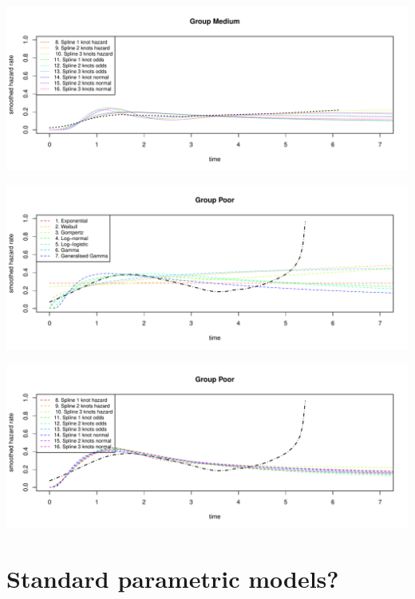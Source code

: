 \documentclass[
]{article}
\begin{document}
\begin{flushleft}\includegraphics[height=0.29\textheight]{Images/plot_haz_pred-4} \end{flushleft}

\begin{flushleft}\includegraphics[height=0.29\textheight]{Images/plot_haz_pred-5} \end{flushleft}

\begin{flushleft}\includegraphics[height=0.29\textheight]{Images/plot_haz_pred-6} \end{flushleft}

\newpage

\hypertarget{standard-parametric-models}{%
\section{Standard parametric models?}\label{standard-parametric-models}}
\end{document}

